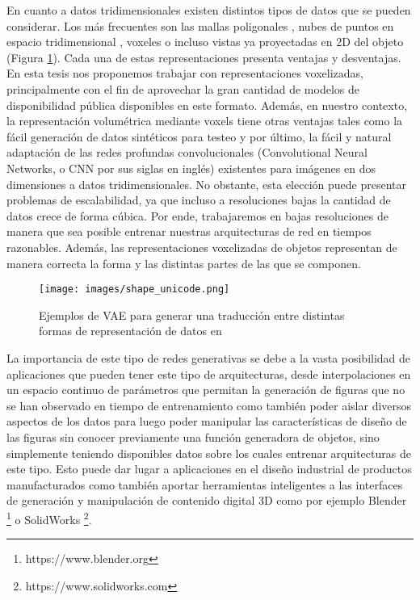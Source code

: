 \documentclass[spanish]{article}
\begin{document}
En cuanto a datos tridimensionales existen distintos tipos de datos que se pueden considerar. Los más frecuentes
son las mallas poligonales \cite{Groueix2018}, nubes de puntos en espacio tridimensional \cite{qi2017pointnet},
voxeles \cite{girdhar2016learning} o incluso vistas ya proyectadas en 2D del objeto  \cite{Muralikrishnan2019}
(Figura \ref{ShapeUnicode}). Cada una de estas representaciones presenta ventajas y desventajas. En esta tesis
nos proponemos trabajar con representaciones voxelizadas, principalmente con el fin de aprovechar la gran
cantidad de modelos de disponibilidad pública disponibles en este formato. Además, en nuestro contexto, la 
representación volumétrica mediante voxels tiene otras ventajas tales como la fácil generación de datos
sintéticos para testeo y por último, la fácil y natural adaptación de las redes profundas convolucionales
(Convolutional Neural Networks, o CNN por sus siglas en inglés) existentes para imágenes en dos dimensiones a
datos tridimensionales. No obstante, esta elección puede presentar problemas de escalabilidad, ya que incluso
a resoluciones bajas la cantidad de datos crece de forma cúbica. Por ende, trabajaremos en bajas resoluciones
de manera que sea posible entrenar nuestras arquitecturas de red en tiempos razonables. Además, las
representaciones voxelizadas de objetos representan de manera correcta la forma y las distintas partes de las
que se componen.

\begin{figure}[h]
\texttt{[image: images/shape\_unicode.png]}
\centering
\caption{Ejemplos de VAE para generar una traducción entre distintas formas de representación de datos en \cite{Muralikrishnan2019}}
\label{ShapeUnicode}
\end{figure}


La importancia de este tipo de redes generativas se debe a la vasta posibilidad de aplicaciones que pueden
tener este tipo de arquitecturas, desde interpolaciones en un espacio continuo de parámetros que permitan la
generación de figuras que no se han observado en tiempo de entrenamiento como también poder aislar diversos
aspectos de los datos para luego poder manipular las características de diseño de las figuras sin conocer
previamente una función generadora de objetos, sino simplemente teniendo disponibles datos sobre los cuales
entrenar arquitecturas de este tipo. Esto puede dar lugar a aplicaciones en el diseño industrial de productos
manufacturados como también aportar herramientas inteligentes a las interfaces de generación y manipulación
de contenido digital 3D como por ejemplo Blender \footnote{https://www.blender.org} o SolidWorks
\footnote{https://www.solidworks.com}.
\end{document}
